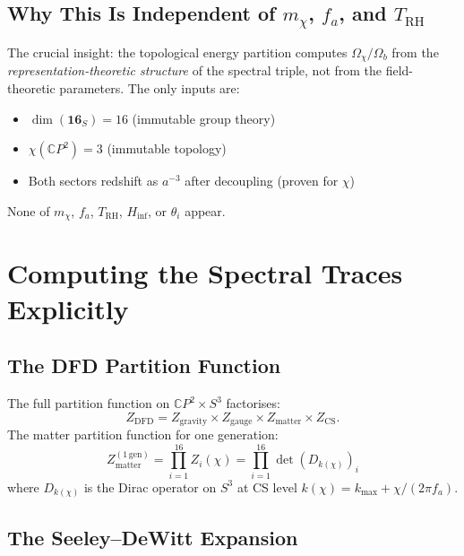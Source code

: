 \documentclass[11pt]{article}
\theoremstyle{definition}
\theoremstyle{remark}
\newcommand{\CP}{\mathbb{C}P}
\begin{document}
\subsection{Why This Is Independent of $m_\chi$, $f_a$, and $T_\mathrm{RH}$}

The crucial insight: the topological energy partition computes
$\Omega_\chi/\Omega_b$ from the \emph{representation-theoretic structure}
of the spectral triple, not from the field-theoretic parameters. The
only inputs are:
\begin{itemize}
  \item $\dim(\mathbf{16}_S) = 16$ (immutable group theory)
  \item $\chi(\CP^2) = 3$ (immutable topology)
  \item Both sectors redshift as $a^{-3}$ after decoupling (proven for $\chi$)
\end{itemize}

None of $m_\chi$, $f_a$, $T_\mathrm{RH}$, $H_\mathrm{inf}$, or
$\theta_i$ appear.


\section{Computing the Spectral Traces Explicitly}
\label{sec:traces}

\subsection{The DFD Partition Function}

The full partition function on $\CP^2 \times S^3$ factorises:
\begin{equation}
  Z_\mathrm{DFD} = Z_\mathrm{gravity} \times Z_\mathrm{gauge}
  \times Z_\mathrm{matter} \times Z_\mathrm{CS}.
\end{equation}
The matter partition function for one generation:
\begin{equation}
  Z_\mathrm{matter}^{(1\,\mathrm{gen})}
  = \prod_{i=1}^{16} Z_i(\chi)
  = \prod_{i=1}^{16} \det(D_{k(\chi)})_i
\end{equation}
where $D_{k(\chi)}$ is the Dirac operator on $S^3$ at CS level
$k(\chi) = k_\mathrm{max} + \chi/(2\pi f_a)$.

\subsection{The Seeley--DeWitt Expansion}
\end{document}
